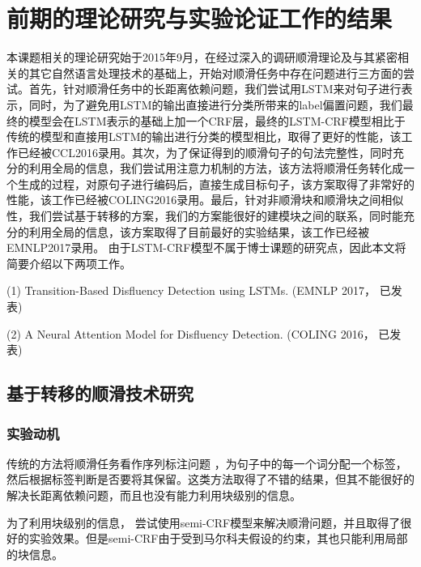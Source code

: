 \section{前期的理论研究与实验论证工作的结果}

本课题相关的理论研究始于2015年9月，在经过深入的调研顺滑理论及与其紧密相关的其它自然语言处理技术的基础上，开始对顺滑任务中存在问题进行三方面的尝试。首先，针对顺滑任务中的长距离依赖问题，我们尝试用LSTM来对句子进行表示，同时，为了避免用LSTM的输出直接进行分类所带来的label偏置问题，我们最终的模型会在LSTM表示的基础上加一个CRF层，最终的LSTM-CRF模型相比于传统的模型和直接用LSTM的输出进行分类的模型相比，取得了更好的性能，该工作已经被CCL2016录用。其次，为了保证得到的顺滑句子的句法完整性，同时充分的利用全局的信息，我们尝试用注意力机制的方法，该方法将顺滑任务转化成一个生成的过程，对原句子进行编码后，直接生成目标句子，该方案取得了非常好的性能，该工作已经被COLING2016录用。最后，针对非顺滑块和顺滑块之间相似性，我们尝试基于转移的方案，我们的方案能很好的建模块之间的联系，同时能充分的利用全局的信息，该方案取得了目前最好的实验结果，该工作已经被EMNLP2017录用。
由于LSTM-CRF模型不属于博士课题的研究点，因此本文将简要介绍以下两项工作。


(1) Transition-Based Disfluency Detection using LSTMs. (EMNLP 2017， 已发表)

(2) A Neural Attention Model for Disfluency Detection. (COLING 2016， 已发表)




\subsection{基于转移的顺滑技术研究}
\subsubsection{实验动机}
传统的方法将顺滑任务看作序列标注问题 ，为句子中的每一个词分配一个标签，然后根据标签判断是否要将其保留。这类方法取得了不错的结果，但其不能很好的解决长距离依赖问题，而且也没有能力利用块级别的信息。

为了利用块级别的信息， 尝试使用semi-CRF模型来解决顺滑问题，并且取得了很好的实验效果。但是semi-CRF由于受到马尔科夫假设的约束，其也只能利用局部的块信息。

